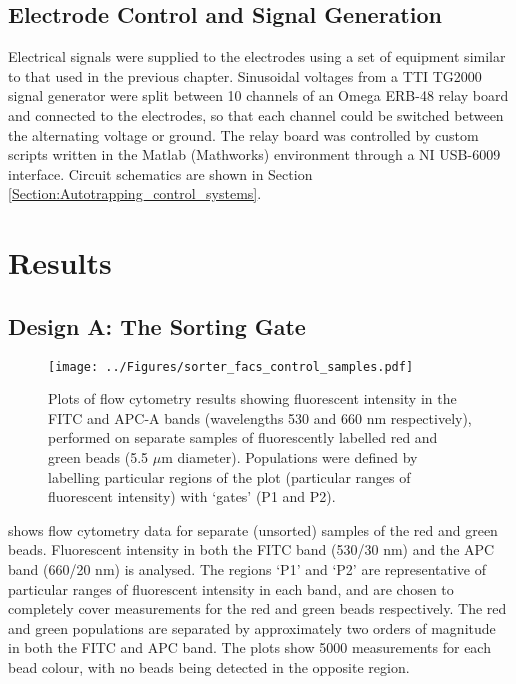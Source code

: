 \subsection{Electrode Control and Signal Generation}

Electrical signals were supplied to the electrodes using a set of equipment similar to that used in the previous chapter. Sinusoidal voltages from a TTI TG2000 signal generator were split between 10 channels of an Omega ERB-48 relay board and connected to the electrodes, so that each channel could be switched between the alternating voltage or ground. The relay board was controlled by custom scripts written in the Matlab (Mathworks) environment through a NI USB-6009 interface. Circuit schematics are shown in Section \ref{Section:Autotrapping_control_systems}.


\section{Results}

\subsection{Design A: The Sorting Gate}

\begin{figure}
 \centering
 \texttt{[image: ../Figures/sorter\_facs\_control\_samples.pdf]}
 \caption[Plots of flow cytometry results of separate samples of fluorescently labelled red and green beads.]{Plots of flow cytometry results showing fluorescent intensity in the FITC and APC-A bands (wavelengths 530 and 660 nm respectively), performed on separate samples of fluorescently labelled red and green beads (5.5 $\mu$m diameter). Populations were defined by labelling particular regions of the plot (particular ranges of fluorescent intensity) with `gates' (P1 and P2).}
 \label{fig:sorter_facs_control_samples}
\end{figure}

 shows flow cytometry data for separate (unsorted) samples of the red and green beads. Fluorescent intensity in both the FITC band (530/30 nm) and the APC band (660/20 nm) is analysed. The regions `P1' and `P2' are representative of particular ranges of fluorescent intensity in each band, and are chosen to completely cover measurements for the red and green beads respectively. The red and green populations are separated by approximately two orders of magnitude in both the FITC and APC band. The plots show 5000 measurements for each bead colour, with no beads being detected in the opposite region.

